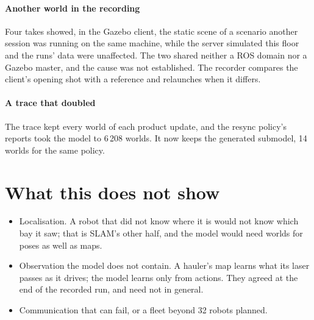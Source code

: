 \documentclass[11pt,a4paper]{article}
\theoremstyle{definition}
\begin{document}
\paragraph{Another world in the recording}
Four takes showed, in the Gazebo client, the static scene of a scenario another
session was running on the same machine, while the server simulated this floor
and the runs' data were unaffected. The two shared neither a ROS domain nor a
Gazebo master, and the cause was not established. The recorder compares the
client's opening shot with a reference and relaunches when it differs.

\paragraph{A trace that doubled}
The trace kept every world of each product update, and the resync policy's
reports took the model to 6\,208 worlds. It now keeps the generated submodel,
14 worlds for the same policy.

\section{What this does not show}
\label{sec:limits}

\begin{itemize}[leftmargin=1.4em, itemsep=2pt]
  \item Localisation. A robot that did not know where it is would not know which
        bay it saw; that is SLAM's other half, and the model would need worlds
        for poses as well as maps.
  \item Observation the model does not contain. A hauler's map learns what its
        laser passes as it drives; the model learns only from actions. They agreed
        at the end of the recorded run, and need not in general.
  \item Communication that can fail, or a fleet beyond 32 robots planned.
\end{itemize}
\end{document}
